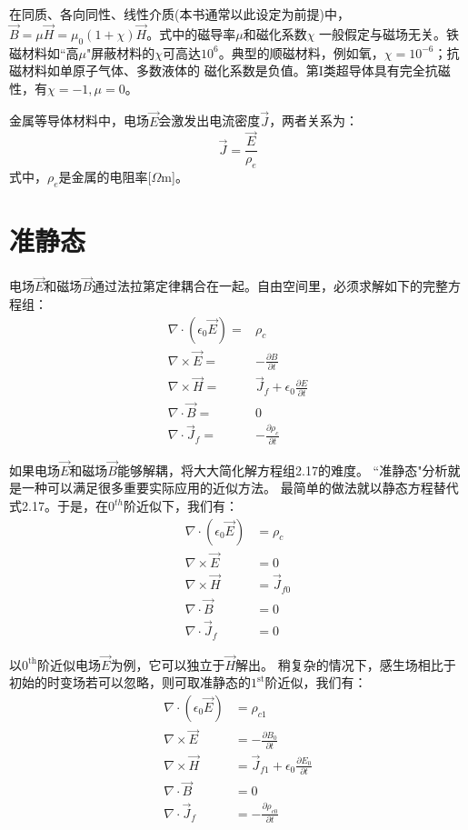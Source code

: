 在同质、各向同性、线性介质(本书通常以此设定为前提)中，$\vec{B}=\mu \vec{H}=\mu_0(1+\chi)\vec{H}$。式中的磁导率$\mu$和磁化系数$\chi$
一般假定与磁场无关。铁磁材料如``高$\mu$"屏蔽材料的$\chi$可高达$10^6$。典型的顺磁材料，例如氧，$\chi=10^{-6}$；抗磁材料如单原子气体、多数液体的
磁化系数是负值。第I类超导体具有完全抗磁性，有$\chi=-1, \mu=0$。

金属等导体材料中，电场$\vec{E}$会激发出电流密度$\vec{J}$，两者关系为：
\begin{equation}
  \vec{J}=\frac{\vec{E}}{\rho_e}
\end{equation}
式中，$\rho_e$是金属的电阻率[$\Omega$m]。

\section{准静态}
电场$\vec{E}$和磁场$\vec{B}$通过法拉第定律耦合在一起。自由空间里，必须求解如下的完整方程组：
\begin{subequations}
	\begin{align}
\nabla \cdot (\epsilon_0\vec{E})=&\rho_c \\
\nabla \times \vec{E} =&-\frac{\partial{B}}{\partial{t}} \\
\nabla \times \vec{H} =&\vec{J}_f+\epsilon_0 \frac{\partial{E}}{\partial{t}}  \\
\nabla \cdot \vec{B} =&0  \\
\nabla \cdot \vec{J}_f =&-\frac{\partial{\rho_{c}}}{\partial{t}}
	\end{align}
\end{subequations}

如果电场$\vec{E}$和磁场$\vec{B}$能够解耦，将大大简化解方程组2.17的难度。
``准静态"分析就是一种可以满足很多重要实际应用的近似方法。
最简单的做法就以静态方程替代式2.17。于是，在$0^{th}$阶近似下，我们有：
\begin{subequations}
	\begin{align}
\nabla \cdot (\epsilon_0\vec{E}) &=\rho_c \\
\nabla \times \vec{E} &=0  \\
\nabla \times \vec{H} &=\vec{J}_{f0}  \\
\nabla \cdot \vec{B} &=0  \\
\nabla \cdot \vec{J}_f &=0
	\end{align}
\end{subequations}

以$\mathrm{0^{th}}$阶近似电场$\vec{E}$为例，它可以独立于$\vec{H}$解出。
稍复杂的情况下，感生场相比于初始的时变场若可以忽略，则可取准静态的$\mathrm{1^{st}}$阶近似，我们有：
\begin{subequations}
	\begin{align}
\nabla \cdot (\epsilon_0\vec{E}) &=\rho_{c1} \\
\nabla \times \vec{E} &=-\frac{\partial{B_0}}{\partial{t}} \\
\nabla \times \vec{H} &=\vec{J}_{f1}+\epsilon_0 \frac{\partial{E_0}}{\partial{t}}  \\
\nabla \cdot \vec{B} &=0 \\
\nabla \cdot \vec{J}_f &=-\frac{\partial{\rho_{c0}}}{\partial{t}}
	\end{align}
\end{subequations}


